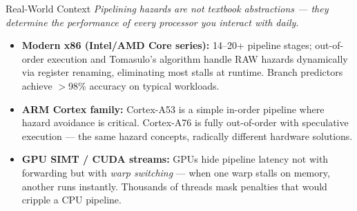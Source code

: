 \documentclass{beamer}
\begin{document}
\begin{frame}{Real-World Context}
  \textit{Pipelining hazards are not textbook abstractions --- they determine
  the performance of every processor you interact with daily.}

  \medskip
  \begin{itemize}
    \item \textbf{Modern x86 (Intel/AMD Core series):} 14--20+ pipeline stages;
          out-of-order execution and Tomasulo's algorithm handle RAW hazards
          dynamically via register renaming, eliminating most stalls at runtime.
          Branch predictors achieve $>$98\% accuracy on typical workloads.
    \item \textbf{ARM Cortex family:} Cortex-A53 is a simple in-order pipeline
          where hazard avoidance is critical. Cortex-A76 is fully out-of-order
          with speculative execution --- the same hazard concepts, radically
          different hardware solutions.
    \item \textbf{GPU SIMT / CUDA streams:} GPUs hide pipeline latency not
          with forwarding but with \emph{warp switching} --- when one warp
          stalls on memory, another runs instantly. Thousands of threads mask
          penalties that would cripple a CPU pipeline.
  \end{itemize}
\end{frame}
\end{document}
